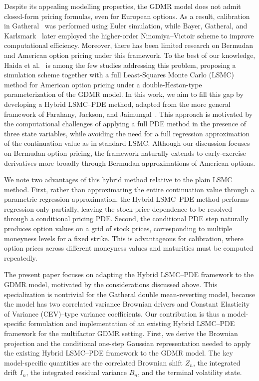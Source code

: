 \documentclass[pdflatex,sn-mathphys-num]{sn-jnl}
\theoremstyle{thmstyleone}%
\theoremstyle{thmstylethree}%
\theoremstyle{thmstyletwo}%
\begin{document}
Despite its appealing modelling properties, the GDMR model does not admit closed-form pricing formulas, even for European options. As a result, calibration in Gatheral~\cite{gatheral2008} was performed using Euler simulation, while Bayer, Gatheral, and Karlsmark~\cite{bayer2013fast} later employed the higher-order Ninomiya--Victoir scheme to improve computational efficiency. Moreover, there has been limited research on Bermudan and American option pricing under this framework. To the best of our knowledge, Haida et al.~\cite{haida2026almost} is among the few studies addressing this problem, proposing a simulation scheme together with a full Least-Squares Monte Carlo (LSMC) method for American option pricing under a double-Heston-type parameterization of the GDMR model. In this work, we aim to fill this gap by developing a Hybrid LSMC--PDE method, adapted from the more general framework of Farahany, Jackson, and Jaimungal~\cite{farahany2020mixing}. This approach is motivated by the computational challenges of applying a full PDE method in the presence of three state variables, while avoiding the need for a full regression approximation of the continuation value as in standard LSMC. Although our discussion focuses on Bermudan option pricing, the framework naturally extends to early-exercise derivatives more broadly through Bermudan approximations of American options.


We note two advantages of this hybrid method relative to the plain LSMC method.  First, rather than approximating the entire continuation value through a parametric regression approximation, the Hybrid LSMC--PDE method performs regression only partially, leaving the stock-price dependence to be resolved through a conditional pricing PDE. Second, the conditional PDE step naturally produces option values on a grid of stock prices, corresponding to multiple moneyness levels for a fixed strike. This is advantageous for calibration, where option prices across different moneyness values and maturities must be computed repeatedly.

The present paper focuses on adapting the Hybrid LSMC–PDE framework to the GDMR model, motivated by the considerations discussed above. This specialization is nontrivial for the Gatheral double mean-reverting model, because the model has two correlated variance Brownian drivers and Constant Elasticity of Variance (CEV)--type variance coefficients. Our contribution is thus a model-specific formulation and implementation of an existing Hybrid LSMC–PDE framework for the multifactor GDMR setting. First, we derive the Brownian projection and the conditional one-step Gaussian representation needed to apply the existing Hybrid LSMC--PDE framework to the GDMR model. The key model-specific quantities are the correlated Brownian shift $Z_n$, the integrated drift $I_n$, the integrated residual variance $B_n$, and the terminal volatility
state.  
\end{document}
